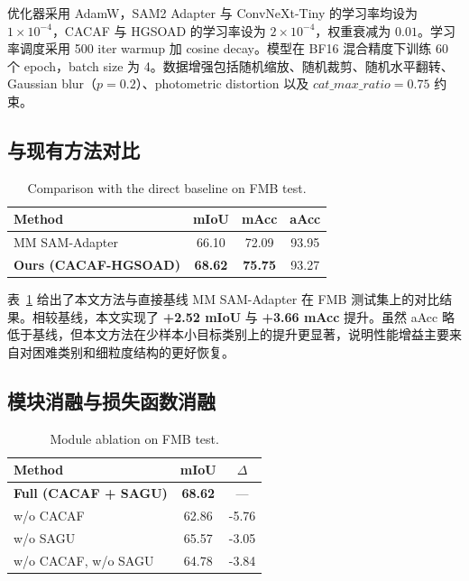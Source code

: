 \documentclass[UTF8,10pt,twocolumn]{ctexart}
\newcommand{\method}{CACAF-HGSOAD}
\begin{document}
优化器采用 AdamW，SAM2 Adapter 与 ConvNeXt-Tiny 的学习率均设为 $1\times10^{-4}$，CACAF 与 HGSOAD 的学习率设为 $2\times10^{-4}$，权重衰减为 $0.01$。学习率调度采用 500 iter warmup 加 cosine decay。模型在 BF16 混合精度下训练 60 个 epoch，batch size 为 4。数据增强包括随机缩放、随机裁剪、随机水平翻转、Gaussian blur（$p=0.2$）、photometric distortion 以及 $cat\_max\_ratio=0.75$ 约束。

\subsection{与现有方法对比}

\begin{table}[t]
    \centering
    \caption{Comparison with the direct baseline on FMB test.}
    \label{tab:main}
    \begin{tabular}{lccc}
        \toprule
        Method & mIoU & mAcc & aAcc \\
        \midrule
        MM SAM-Adapter & 66.10 & 72.09 & 93.95 \\
        \textbf{Ours (\method)} & \textbf{68.62} & \textbf{75.75} & 93.27 \\
        \bottomrule
    \end{tabular}
\end{table}

表~\ref{tab:main} 给出了本文方法与直接基线 MM SAM-Adapter 在 FMB 测试集上的对比结果。相较基线，本文实现了 \textbf{+2.52 mIoU} 与 \textbf{+3.66 mAcc} 提升。虽然 aAcc 略低于基线，但本文方法在少样本小目标类别上的提升更显著，说明性能增益主要来自对困难类别和细粒度结构的更好恢复。

\subsection{模块消融与损失函数消融}

\begin{table}[t]
    \centering
    \caption{Module ablation on FMB test.}
    \label{tab:ablation}
    \begin{tabular}{lcc}
        \toprule
        Method & mIoU & $\Delta$ \\
        \midrule
        \textbf{Full (CACAF + SAGU)} & \textbf{68.62} & --- \\
        w/o CACAF & 62.86 & -5.76 \\
        w/o SAGU & 65.57 & -3.05 \\
        w/o CACAF, w/o SAGU & 64.78 & -3.84 \\
        \bottomrule
    \end{tabular}
\end{table}
\end{document}
